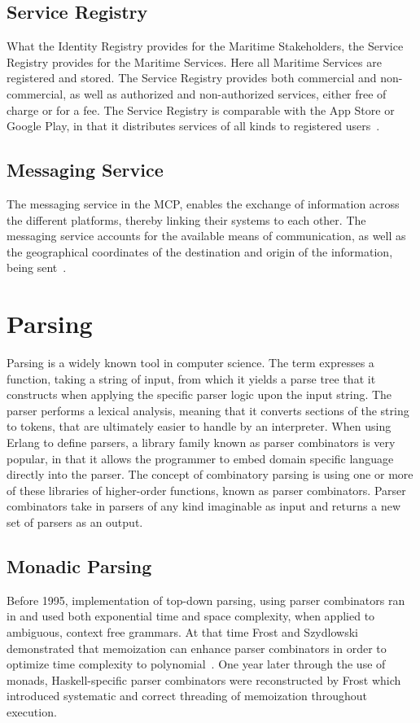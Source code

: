 \subsection{Service Registry}
What the Identity Registry provides for the Maritime Stakeholders, the Service Registry provides for the Maritime Services. Here all Maritime Services are registered and stored. The Service Registry provides both commercial and non-commercial, as well as authorized and non-authorized services, either free of charge or for a fee. The Service Registry is comparable with the App Store or Google Play, in that it distributes services of all kinds to registered users~\cite{efficienSea2}.
\subsection{Messaging Service}
The messaging service in the MCP, enables the exchange of information across the different platforms, thereby linking their systems to each other. The messaging service accounts for the available means of communication, as well as the geographical coordinates of the destination and origin of the information, being sent~\cite{efficienSea2}.

\section{Parsing}
Parsing is a widely known tool in computer science. The term expresses a function, taking a string of input, from which it yields a parse tree that it constructs when applying the specific parser logic upon the input string. The parser performs a lexical analysis, meaning that it converts sections of the string to tokens, that are ultimately easier to handle by an interpreter. When using Erlang to define parsers, a library family known as parser combinators is very popular, in that it allows the programmer to embed domain specific language directly into the parser. The concept of combinatory parsing is using one or more of these libraries of higher-order functions, known as parser combinators. Parser combinators take in parsers of any kind imaginable as input and returns a new set of parsers as an output.
\newpage
\subsection{Monadic Parsing}
Before 1995, implementation of top-down parsing, using parser combinators ran in and used both exponential time and space complexity, when applied to ambiguous, context free grammars. At that time Frost and Szydlowski demonstrated that memoization can enhance parser combinators in order to optimize time complexity to polynomial~\cite{memoization}. One year later through the use of monads, Haskell-specific parser combinators were reconstructed by Frost which introduced systematic and correct threading of memoization throughout execution.

